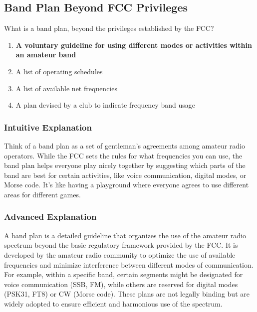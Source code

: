 \subsection{Band Plan Beyond FCC Privileges}
\label{T2A10}

\begin{tcolorbox}[colback=gray!10!white,colframe=black!75!black,title=T2A10]
What is a band plan, beyond the privileges established by the FCC?
\begin{enumerate}[noitemsep]
    \item \textbf{A voluntary guideline for using different modes or activities within an amateur band}
    \item A list of operating schedules
    \item A list of available net frequencies
    \item A plan devised by a club to indicate frequency band usage
\end{enumerate}
\end{tcolorbox}

\subsubsection*{Intuitive Explanation}
Think of a band plan as a set of gentleman's agreements among amateur radio operators. While the FCC sets the rules for what frequencies you can use, the band plan helps everyone play nicely together by suggesting which parts of the band are best for certain activities, like voice communication, digital modes, or Morse code. It's like having a playground where everyone agrees to use different areas for different games.

\subsubsection*{Advanced Explanation}
A band plan is a detailed guideline that organizes the use of the amateur radio spectrum beyond the basic regulatory framework provided by the FCC. It is developed by the amateur radio community to optimize the use of available frequencies and minimize interference between different modes of communication. For example, within a specific band, certain segments might be designated for voice communication (SSB, FM), while others are reserved for digital modes (PSK31, FT8) or CW (Morse code). These plans are not legally binding but are widely adopted to ensure efficient and harmonious use of the spectrum.